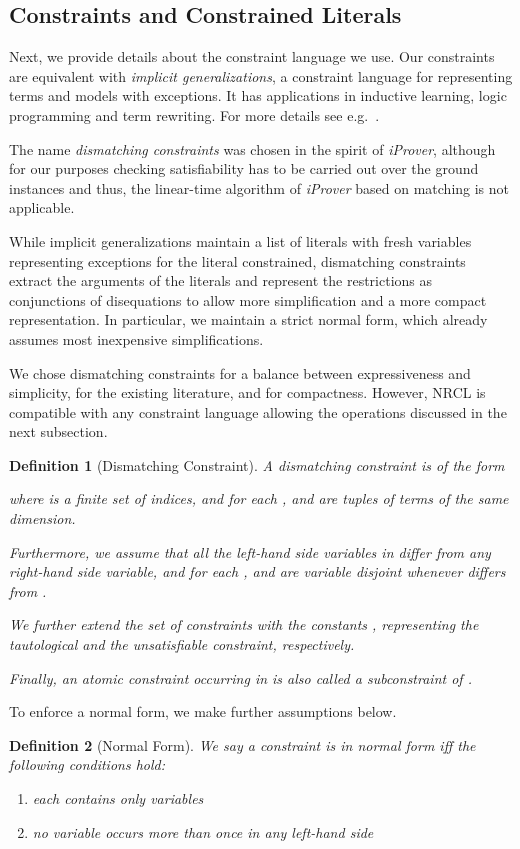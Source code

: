 \documentclass[a4paper]{article}
\newtheorem{defi}{Definition}[section]
\begin{document}
\subsection{Constraints and Constrained Literals}
Next, we provide details about the constraint language we use. Our constraints are equivalent with \emph{implicit generalizations}, a constraint language 
for representing terms and models with exceptions. 
It has applications in inductive learning, logic programming and term rewriting. 
For more details see e.g.\ 
\cite{Comon91}\cite{LassezM87}.

The name \emph{dismatching constraints} was chosen in the spirit of \emph{iProver}\cite{InstaGen13}, although for our purposes checking satisfiability 
has to be carried out over the ground instances and thus, the linear-time algorithm of \emph{iProver} based on matching is not applicable.

While implicit generalizations maintain a list of literals with fresh variables representing exceptions for the literal constrained, 
dismatching constraints extract the arguments of the literals and represent the restrictions as conjunctions of disequations to 
allow more simplification and a more compact representation.
In particular, we maintain a strict normal form, which already assumes most inexpensive simplifications.

We chose dismatching constraints for a balance between expressiveness and simplicity, for the existing literature, and for compactness. 
However, NRCL is compatible with any constraint language allowing the operations discussed in the next subsection.

\begin{defi}[Dismatching Constraint]\label{dmcDef}
A \emph{dismatching constraint}  is of the form

where  is a finite set of indices, and for each ,  and  are tuples of terms of the same dimension. 

Furthermore, we assume that all the left-hand side variables in  differ from any right-hand side variable, 
and for each ,  and   are variable disjoint whenever  differs from .

We further extend the set of constraints with the constants ,  representing the tautological and the unsatisfiable constraint, respectively.

Finally, an \emph{atomic constraint}  occurring in  is also called \emph{a subconstraint of }.
\end{defi}
\noindent
To enforce a normal form, we make further assumptions below.
\begin{defi}[Normal Form]
We say a constraint  is \emph{in normal form} iff
the following conditions hold:
\begin{enumerate}[(1)]
	\item each  contains only variables
	\item no variable occurs more than once in any left-hand side 
\end{enumerate}
\end{defi}
\end{document}
